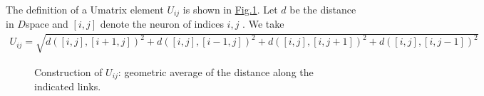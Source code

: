\documentclass[letterpaper,10pt,english]{jupyterBook}
\let\sphinxpxdimen\pdfpxdimen\else\newdimen\sphinxpxdimen
\begin{document}
\sphinxAtStartPar
The definition of a U\sphinxhyphen{}matrix element \(U_{ij}\) is shown in \hyperref[\detokenize{docs/som:udm-fig}]{Fig.\@ \ref{\detokenize{docs/som:udm-fig}}}. Let \(d\) be the distance in \(D\)\sphinxhyphen{}space and \([i,j]\) denote the neuron of indices \(i,j\) . We take
\begin{equation*}
\begin{split}
U_{ij}=\sqrt{d\left([i,j],[i+1,j]\right)^2+d\left([i,j],[i-1,j]\right)^2+
        d\left([i,j],[i,j+1]\right)^2+d\left([i,j],[i,j-1]\right)^2 }
\end{split}
\end{equation*}
\begin{figure}[htbp]
\centering
\capstart

\noindent\sphinxincludegraphics[width=150\sphinxpxdimen]{{udm}.png}
\caption{Construction of \(U_{ij}\): geometric average of the distance along the indicated links.}\label{\detokenize{docs/som:udm-fig}}\end{figure}

\begin{sphinxVerbatim}[commandchars=\\\{\}]
 

   
       
        \PYG{p}{[}\PYG{p}{]}\PYG{p}{[}\PYG{p}{]}\PYG{p}{[}\PYG{p}{]}\PYG{p}{[}\PYG{p}{]}\PYG{p}{[}\PYG{p}{]}\PYG{p}{[}\PYG{p}{]}\PYG{p}{[}\PYG{p}{]}\PYG{p}{[}\PYG{p}{]}\PYG{p}{[}\PYG{p}{]}\PYG{p}{[}\PYG{p}{]}
                            \PYG{p}{[}\PYG{p}{]}\PYG{p}{[}\PYG{p}{]}\PYG{p}{[}\PYG{p}{]}\PYG{p}{[}\PYG{p}{]}\PYG{p}{[}\PYG{p}{]}\PYG{p}{[}\PYG{p}{]}\PYG{p}{[}\PYG{p}{]}\PYG{p}{[}\PYG{p}{]}
\end{sphinxVerbatim}
\end{document}
